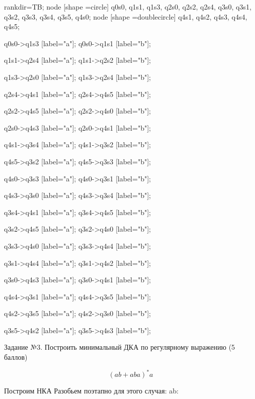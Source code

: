 \documentclass[fleqn]{article}
\begin{document}
 {
    rankdir=TB;
    node [shape =circle] q0s0, q1s1, q1s3, q2s0, q2s2, q2s4, q3s0, q3s1, q3s2, q3s3, q3s4, q3s5, q4s0;
    node [shape =doublecircle] q4s1, q4s2, q4s3, q4s4, q4s5;
    
    q0s0->q1s3 [label="a"];
    q0s0->q1s1 [label="b"];
    
    q1s1->q2s4 [label="a"];
    q1s1->q2s2 [label="b"];
    
    q1s3->q2s0 [label="a"];
    q1s3->q2s4 [label="b"];
    
    q2s4->q4s1 [label="a"];
    q2s4->q4s5 [label="b"];
    
    q2s2->q4s5 [label="a"];
    q2s2->q4s0 [label="b"];
    
    q2s0->q4s3 [label="a"];
    q2s0->q4s1 [label="b"];
    
    q4s1->q3s4 [label="a"];
    q4s1->q3s2 [label="b"];
    
    q4s5->q3s2 [label="a"];
    q4s5->q3s3 [label="b"];

    q4s0->q3s3 [label="a"];
    q4s0->q3s1 [label="b"];
    
    q4s3->q3s0 [label="a"];
    q4s3->q3s4 [label="b"];
    
    q3s4->q4s1 [label="a"];
    q3s4->q4s5 [label="b"];
    
    q3s2->q4s5 [label="a"];
    q3s2->q4s0 [label="b"];
    
    q3s3->q4s0 [label="a"];
    q3s3->q4s4 [label="b"];
    
    q3s1->q4s4 [label="a"];
    q3s1->q4s2 [label="b"];
    
    q3s0->q4s3 [label="a"];
    q3s0->q4s1 [label="b"];
    
    q4s4->q3s1 [label="a"];
    q4s4->q3s5 [label="b"];
    
    q4s2->q3s5 [label="a"];
    q4s2->q3s0 [label="b"];
    
    q3s5->q4s2 [label="a"];
    q3s5->q4s3 [label="b"];
}


\begin{large}
Задание №3. Построить минимальный ДКА по регулярному выражению (5 баллов) 
\end{large}

\begin{equation}
(ab + aba)^* a
\end{equation}

Построим НКА
Разобьем поэтапно для этого случая:
ab:

\end{document}
